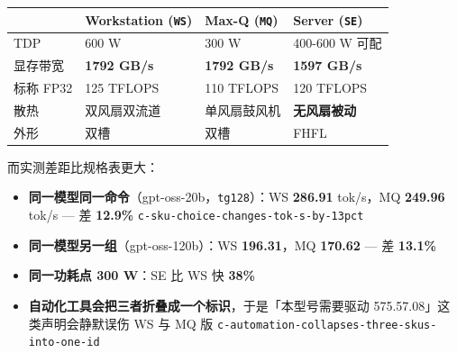 \begin{table}[t]
\centering
\footnotesize
\setlength{\tabcolsep}{4pt}
\label{tab:1}
\begin{tabular}{llll}
\toprule
 & Workstation (\texttt{WS}) & Max-Q (\texttt{MQ}) & Server (\texttt{SE}) \\
\midrule
TDP & 600 W & 300 W & 400-\hspace{0pt}600 W 可配 \\
显存带宽 & \textbf{1792 GB/s} & \textbf{1792 GB/s} & \textbf{1597 GB/s} \\
标称 FP32 & 125 TFLOPS & 110 TFLOPS & 120 TFLOPS \\
散热 & 双风扇双流道 & 单风扇鼓风机 & \textbf{无风扇被动} \\
外形 & 双槽 & 双槽 & FHFL \\
\bottomrule
\end{tabular}
\end{table}

而实测差距比规格表更大：


\begin{itemize}
  \item \textbf{同一模型同一命令}（gpt-oss-20b，\texttt{tg128}）：WS \textbf{286.91} tok/s，MQ \textbf{249.96} tok/s — 差 \textbf{12.9\%} {\scriptsize\texttt{c-\hspace{0pt}sku-\hspace{0pt}choice-\hspace{0pt}changes-\hspace{0pt}tok-\hspace{0pt}s-\hspace{0pt}by-\hspace{0pt}13pct}}
  \item \textbf{同一模型另一组}（gpt-oss-120b）：WS \textbf{196.31}，MQ \textbf{170.62} — 差 \textbf{13.1\%}
  \item \textbf{同一功耗点 300 W}：SE 比 WS 快 \textbf{38\%}
  \item \textbf{自动化工具会把三者折叠成一个标识}，于是「本型号需要驱动 575.57.08」这类声明会静默误伤 WS 与 MQ 版 {\scriptsize\texttt{c-\hspace{0pt}automation-\hspace{0pt}collapses-\hspace{0pt}three-\hspace{0pt}skus-\hspace{0pt}into-\hspace{0pt}one-\hspace{0pt}id}}
\end{itemize}


